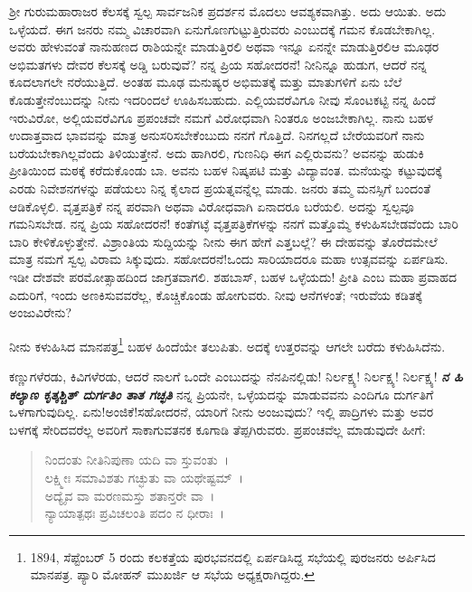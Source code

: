 ಶ‍್ರೀ ಗುರುಮಹಾರಾಜರ ಕೆಲಸಕ್ಕೆ ಸ್ವಲ್ಪ ಸಾರ್ವಜನಿಕ ಪ್ರದರ್ಶನ ಮೊದಲು ಆವಶ್ಯಕವಾಗಿತ್ತು. ಅದು ಆಯಿತು. ಅದು ಒಳ್ಳೆಯದೆ. ಈಗ ಜನರು ನಮ್ಮ ವಿಚಾರವಾಗಿ ಏನುಗೊಣಗುಟ್ಟುತ್ತಿರುವರು ಎಂಬುದಕ್ಕೆ ಗಮನ ಕೊಡಬೇಕಾಗಿಲ್ಲ. ಅವರು ಹೇಳುವಂತೆ ನಾನುಹಣದ ರಾಶಿಯನ್ನೇ ಮಾಡುತ್ತಿರಲಿ ಅಥವಾ ಇನ್ನೂ ಏನನ್ನೇ ಮಾಡುತ್ತಿರಲಿ\enginline{-}ಆ ಮೂಢರ ಅಭಿಮತಗಳು ದೇವರ ಕೆಲಸಕ್ಕೆ ಅಡ್ಡಿ ಬರುವುವೆ? ನನ್ನ ಪ್ರಿಯ ಸಹೋದರನೆ! ನೀನಿನ್ನೂ ಹುಡುಗ, ಆದರೆ ನನ್ನ ಕೂದಲಾಗಲೇ ನರೆಯುತ್ತಿದೆ. ಅಂತಹ ಮೂಢ ಮನುಷ್ಯರ ಅಭಿಮತಕ್ಕೆ ಮತ್ತು ಮಾತುಗಳಿಗೆ ಏನು ಬೆಲೆ ಕೊಡುತ್ತೇನೆಂಬುದನ್ನು ನೀನು ಇದರಿಂದಲೆ ಊಹಿಸಬಹುದು. ಎಲ್ಲಿಯವರೆವಿಗೂ ನೀವು ಸೊಂಟಕಟ್ಟಿ ನನ್ನ ಹಿಂದೆ ಇರುವಿರೋ, ಅಲ್ಲಿಯವರೆವಿಗೂ ಪ್ರಪಂಚವೇ ನಮಗೆ ವಿರೋಧವಾಗಿ ನಿಂತರೂ ಅಂಜಬೇಕಾಗಿಲ್ಲ. ನಾನು ಬಹಳ ಉದಾತ್ತವಾದ ಭಾವವನ್ನು ಮಾತ್ರ ಅನುಸರಿಸಬೇಕೆಂಬುದು ನನಗೆ ಗೊತ್ತಿದೆ. ನಿನಗಲ್ಲದೆ ಬೇರೆಯವರಿಗೆ ನಾನು ಬರೆಯಬೇಕಾಗಿಲ್ಲವೆಂದು ತಿಳಿಯುತ್ತೇನೆ. ಅದು ಹಾಗಿರಲಿ, ಗುಣನಿಧಿ ಈಗ ಎಲ್ಲಿರುವನು? ಅವನನ್ನು ಹುಡುಕಿ ಪ್ರೀತಿಯಿಂದ ಮಠಕ್ಕೆ ಕರೆದುಕೊಂಡು ಬಾ. ಅವನು ಬಹಳ ನಿಷ್ಕಪಟಿ ಮತ್ತು ವಿದ್ಯಾವಂತ. ಮನೆಯನ್ನು ಕಟ್ಟುವುದಕ್ಕೆ ಎರಡು ನಿವೇಶನಗಳನ್ನು ಪಡೆಯಲು ನಿನ್ನ ಕೈಲಾದ ಪ್ರಯತ್ನವನ್ನೆಲ್ಲ ಮಾಡು. ಜನರು ತಮ್ಮ ಮನಸ್ಸಿಗೆ ಬಂದಂತೆ ಆಡಿಕೊಳ್ಳಲಿ. ವೃತ್ತಪತ್ರಿಕೆ ನನ್ನ ಪರವಾಗಿ ಅಥವಾ ವಿರೋಧವಾಗಿ ಏನಾದರೂ ಬರೆಯಲಿ. ಅದನ್ನು ಸ್ವಲ್ಪವೂ ಗಮನಿಸಬೇಡ. ನನ್ನ ಪ್ರಿಯ ಸಹೋದರನೆ! ಕಂತೆಗಟ್ಳೆ ವೃತ್ತಪತ್ರಿಕೆಗಳನ್ನು ನನಗೆ ಮತ್ತೊಮ್ಮೆ ಕಳುಹಿಸಬೇಡವೆಂದು ಬಾರಿ ಬಾರಿ ಕೇಳಿಕೊಳ್ಳುತ್ತೇನೆ. ವಿಶ್ರಾಂತಿಯ ಸುದ್ದಿಯನ್ನು ನೀನು ಈಗ ಹೇಗೆ ಎತ್ತಬಲ್ಲೆ? ಈ ದೇಹವನ್ನು ತೊರೆದಮೇಲೆ ಮಾತ್ರ ನಮಗೆ ಸ್ವಲ್ಪ ವಿರಾಮ ಸಿಕ್ಕುವುದು. ಸಹೋದರನೆ!ಒಂದು ಸಾರಿಯಾದರೂ ಮಹಾ ಉತ್ಸವವನ್ನು ಏರ್ಪಡಿಸು. ಇಡೀ ದೇಶವೇ ಪರಮೋತ್ಸಾಹದಿಂದ ಜಾಗ್ರತವಾಗಲಿ. ಶಹಬಾಸ್, ಬಹಳ ಒಳ್ಳೆಯದು! ಪ್ರೀತಿ ಎಂಬ ಮಹಾ ಪ್ರವಾಹದ ಎದುರಿಗೆ, ಇಂದು ಅಣಕಿಸುವವರೆಲ್ಲ, ಕೊಚ್ಚಿಕೊಂಡು ಹೋಗುವರು. ನೀವು ಆನೆಗಳಂತೆ; ಇರುವೆಯ ಕಡಿತಕ್ಕೆ ಅಂಜುವಿರೇನು?

\vspace{0.1cm}

ನೀನು ಕಳುಹಿಸಿದ ಮಾನಪತ್ರ\footnote{1894, ಸೆಪ್ಟೆಂಬರ್ 5 ರಂದು ಕಲಕತ್ತೆಯ ಪುರಭವನದಲ್ಲಿ ಏರ್ಪಡಿಸಿದ್ದ ಸಭೆಯಲ್ಲಿ ಪುರಜನರು ಅರ್ಪಿಸಿದ ಮಾನಪತ್ರ. ಪ್ಯಾರಿ ಮೋಹನ್ ಮುಖರ್ಜಿ ಆ ಸಭೆಯ ಅಧ್ಯಕ್ಷರಾಗಿದ್ದರು.} ಬಹಳ ಹಿಂದೆಯೇ ತಲುಪಿತು. ಅದಕ್ಕೆ ಉತ್ತರವನ್ನು ಆಗಲೇ ಬರೆದು ಕಳುಹಿಸಿದೆನು.

\vspace{0.1cm}

ಕಣ್ಣುಗಳೆರಡು, ಕಿವಿಗಳೆರಡು, ಆದರೆ ನಾಲಗೆ ಒಂದೇ ಎಂಬುದನ್ನು ನೆನಪಿನಲ್ಲಿಡು! ನಿರ್ಲಕ್ಷ್ಯ! ನಿರ್ಲಕ್ಷ್ಯ! ನಿರ್ಲಕ್ಷ್ಯ! \textbf{\textit{ನ ಹಿ ಕಲ್ಯಾಣ ಕೃತ್ಕಶ್ಚಿತ್ ದುರ್ಗತಿಂ ತಾತ ಗಚ್ಛತಿ}} ನನ್ನ ಪ್ರಿಯನೇ, ಒಳ್ಳೆಯದನ್ನು ಮಾಡುವವನು ಎಂದಿಗೂ ದುರ್ಗತಿಗೆ ಒಳಗಾಗುವುದಿಲ್ಲ. ಏನು!ಅಂಜಿಕೆ!ಸಹೋದರನೆ, ಯಾರಿಗೆ ನೀನು ಅಂಜುವುದು? ಇಲ್ಲಿ ಪಾದ್ರಿಗಳು ಮತ್ತು ಅವರ ಬಳಗಕ್ಕೆ ಸೇರಿದವರೆಲ್ಲ ಅವರಿಗೆ ಸಾಕಾಗುವತನಕ ಕೂಗಾಡಿ ತೆಪ್ಪಗಿರುವರು. ಪ್ರಪಂಚವೆಲ್ಲ ಮಾಡುವುದೇ ಹೀಗೆ:
\begin{verse}
 ನಿಂದಂತು ನೀತಿನಿಪುಣಾ ಯದಿ ವಾ ಸ್ತುವಂತು~।\\
 ಲಕ್ಷ್ಮೀಃ ಸಮಾವಿಶತು ಗಚ್ಛುತು ವಾ ಯಥೇಷ್ಟಮ್~।\\
 ಅದ್ಯೈವ ವಾ ಮರಣಮಸ್ತು ಶತಾನ್ತರೇ ವಾ~।\\
 ನ್ಯಾಯಾತ್ಪಥಃ ಪ್ರವಿಚಲಂತಿ ಪದಂ ನ ಧೀರಾಃ~।  
\end{verse}

